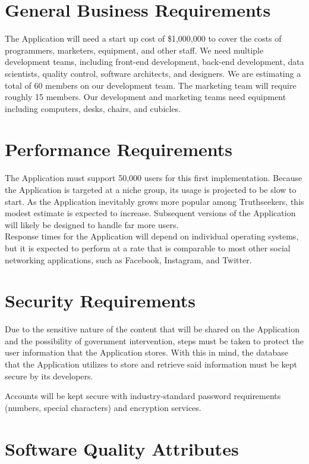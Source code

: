 \section{General Business Requirements}

The Application will need a start up cost of \$1,000,000 to cover the costs of programmers, marketers, equipment, and other staff. We need multiple development teams, including front-end development, back-end development, data scientists, quality control, software architects, and designers. We are estimating a total of 60 members on our development team. The marketing team will require roughly 15 members. Our development and marketing teams need equipment including computers, desks, chairs, and cubicles.

\section{Performance Requirements}

The Application must support 50,000 users for this first implementation. Because the Application is targeted at a niche group, its usage is projected to be slow to start. As the Application inevitably grows more popular among Truthseekers, this modest estimate is expected to increase. Subsequent versions of the Application will likely be designed to handle far more users. \\

Response times for the Application will depend on individual operating systems, but it is expected to perform at a rate that is comparable to most other social networking applications, such as Facebook, Instagram, and Twitter.

\section{Security Requirements}

Due to the sensitive nature of the content that will be shared on the Application and the possibility of government intervention, steps must be taken to protect the user information that the Application stores. With this in mind, the database that the Application utilizes to store and retrieve said information must be kept secure by its developers. 

Accounts will be kept secure with industry-standard password requirements (numbers, special characters) and encryption services. 

\section{Software Quality Attributes}

